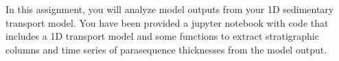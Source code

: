 \noindent In this assignment, you will analyze model outputs from your 1D sedimentary transport model. You have been provided a jupyter notebook with code that includes a 1D transport model and some functions to extract stratigraphic columns and time series of parasequence thicknesses from the model output.
